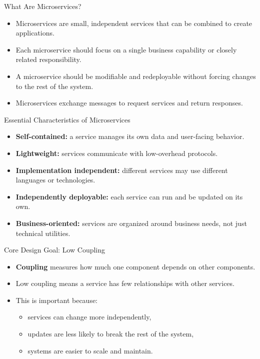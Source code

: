 \begin{frame}{What Are Microservices?}
\begin{itemize}
    \item Microservices are small, independent services that can be combined to create applications.
    \item Each microservice should focus on a single business capability or closely related responsibility.
    \item A microservice should be modifiable and redeployable without forcing changes to the rest of the system.
    \item Microservices exchange messages to request services and return responses.
\end{itemize}
\end{frame}

\begin{frame}{Essential Characteristics of Microservices}
\begin{itemize}
    \item \textbf{Self-contained:} a service manages its own data and user-facing behavior.
    \item \textbf{Lightweight:} services communicate with low-overhead protocols.
    \item \textbf{Implementation independent:} different services may use different languages or technologies.
    \item \textbf{Independently deployable:} each service can run and be updated on its own.
    \item \textbf{Business-oriented:} services are organized around business needs, not just technical utilities.
\end{itemize}
\end{frame}

\begin{frame}{Core Design Goal: Low Coupling}
\begin{itemize}
    \item \textbf{Coupling} measures how much one component depends on other components.
    \item Low coupling means a service has few relationships with other services.
    \item This is important because:
    \begin{itemize}
        \item services can change more independently,
        \item updates are less likely to break the rest of the system,
        \item systems are easier to scale and maintain.
    \end{itemize}
\end{itemize}
\end{frame}

